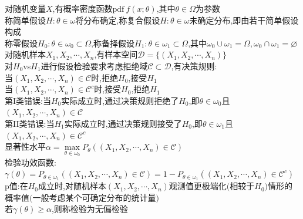 \begin{dingyi}
对随机变量$X$,有概率密度函数$\mathrm{pdf}\ f(x;\theta)$,其中$\theta\in\Omega$为参数\\
称简单假设$H:\theta\in \omega$将分布确定,称复合假设$H:\theta\in \omega$未确定分布,即由若干简单假设构成\\
称零假设$H_0:\theta\in\omega_0\subset\Omega$,称备择假设$H_1:\theta\in\omega_1\subset\Omega$,其中$\omega_0\cup\omega_1=\Omega,\omega_0\cap\omega_1=\varnothing$\\
对随机样本$X_1,X_2,\cdots,X_n$,有样本空间$\mathcal{D}=\{(X_1,X_2,\cdots,X_n)\}$\\
对$H_0$vs$H_1$进行假设检验要求考虑拒绝域$\mathcal{C}\subset\mathcal{D}$,有决策规则:\\
当$(X_1,X_2,\cdots,X_n)\in\mathcal{C}$时,拒绝$H_0$,接受$H_1$\\
当$(X_1,X_2,\cdots,X_n)\in\mathcal{C}^{c}$时,接受$H_0$,拒绝$H_1$\\
第I类错误:当$H_0$实际成立时,通过决策规则拒绝了$H_0$,即$\theta\in\omega_0$且$(X_1,X_2,\cdots,X_n)\in\mathcal{C}$\\
第II类错误:当$H_1$实际成立时,通过决策规则接受了$H_0$,即$\theta\in\omega_1$且$(X_1,X_2,\cdots,X_n)\in\mathcal{C}^{c}$\\
显著性水平$\alpha=\max\limits_{\theta\in\omega_0}P_{\theta}((X_1,X_2,\cdots,X_n)\in\mathcal{C})$\\
检验功效函数:$\gamma(\theta)=P_{\theta\in\omega_1}((X_1,X_2,\cdots,X_n)\in\mathcal{C})=1-P_{\theta\in\omega_1}((X_1,X_2,\cdots,X_n)\in\mathcal{C}^{c})$\\
p值:在$H_0$成立时,对随机样本$(X_1,X_2,\cdots,X_n)$观测值更极端化$($相较于$H_0$$)$情形的概率值$($一般考虑某个可确定分布的统计量$)$\\
若$\gamma(\theta)\geq\alpha$,则称检验为无偏检验
\end{dingyi}

